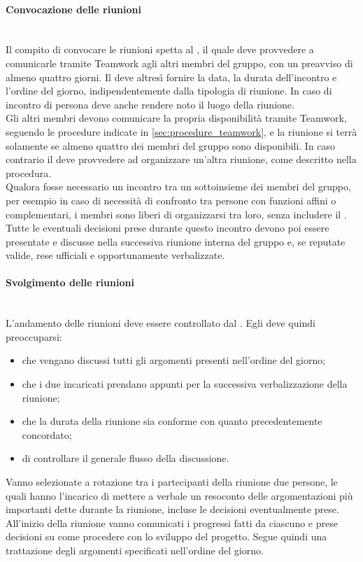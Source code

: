 \paragraph{Convocazione delle riunioni}\mbox{}\\
Il compito di convocare le riunioni spetta al \Responsabile, il quale deve provvedere a comunicarle tramite Teamwork agli altri membri del gruppo, con un preavviso di almeno quattro giorni. Il \Responsabile{} deve altresì fornire la data, la durata dell'incontro e l'ordine del giorno, indipendentemente dalla tipologia di riunione. In caso di incontro di persona deve anche rendere noto il luogo della riunione.\\
Gli altri membri devono comunicare la propria disponibilità tramite Teamwork, seguendo le procedure indicate in \sezione \ref{sec:procedure_teamwork}, e la riunione si terrà solamente se almeno quattro dei membri del gruppo sono disponibili. In caso contrario il \Responsabile{} deve provvedere ad organizzare un'altra riunione, come descritto nella procedura.\\
Qualora fosse necessario un incontro tra un sottoinsieme dei membri del gruppo, per esempio in caso di necessità di confronto tra persone con funzioni affini o complementari, i membri sono liberi di organizzarsi tra loro, senza includere il \Responsabile. Tutte le eventuali decisioni prese durante questo incontro devono poi essere presentate e discusse nella successiva riunione interna del gruppo e, se reputate valide, rese ufficiali e opportunamente verbalizzate.

\paragraph{Svolgimento delle riunioni}\label{sec:svolgimento_riunioni_interne} \mbox{}\\
L'andamento delle riunioni deve essere controllato dal \Responsabile. Egli deve quindi preoccuparsi:

\begin{itemize}
	\item che vengano discussi tutti gli argomenti presenti nell'ordine del giorno;
	\item che i due incaricati prendano appunti per la successiva verbalizzazione della riunione;
	\item che la durata della riunione sia conforme con quanto precedentemente concordato;
	\item di controllare il generale flusso della discussione.
\end{itemize}
Vanno selezionate a rotazione tra i partecipanti della riunione due persone, le quali hanno l'incarico di mettere a verbale un resoconto delle argomentazioni più importanti dette durante la riunione, incluse le decisioni eventualmente prese. All'inizio della riunione vanno comunicati i progressi fatti da ciascuno e prese decisioni su come procedere con lo sviluppo del progetto. Segue quindi una trattazione degli argomenti specificati nell'ordine del giorno. 

